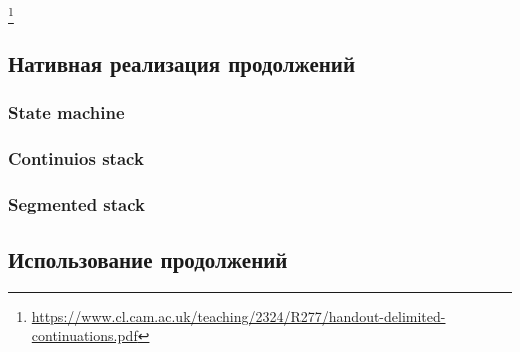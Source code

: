 \footnote{\url{https://www.cl.cam.ac.uk/teaching/2324/R277/handout-delimited-continuations.pdf}}

\cite{dyvbig2007monadic}





\subsection{Нативная реализация продолжений}

\subsubsection{State machine}



\subsubsection{Continuios stack}


\subsubsection{Segmented stack}


\subsection{Использование продолжений}













